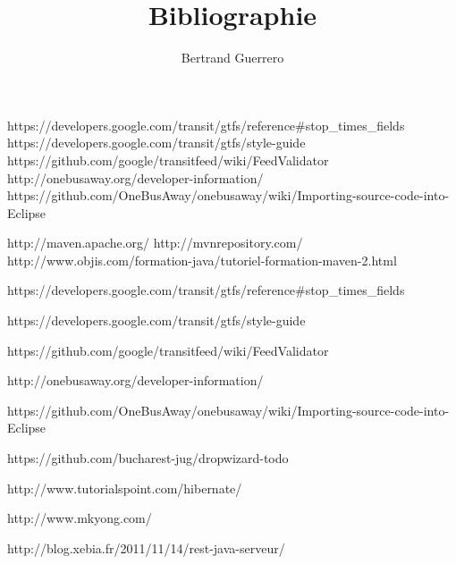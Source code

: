 \documentclass[a4paper,12pt]{report}
\title{Bibliographie}
\author{Bertrand Guerrero}
\date{}
\begin{document}
\cite{ref1}
\cite{ref2}
\cite{ref3}
\cite{ref4}
\cite{ref5}
\cite{ref6}
\cite{ref7}
\cite{ref8}
\cite{ref9}
\cite{ref10}
\cite{ref11}
\cite{ref12}
\cite{ref13}
\cite{ref14}
\cite{ref15}
\cite{ref16}
\cite{ref17}
\cite{ref18}
\cite{ref19}



https://developers.google.com/transit/gtfs/reference#stop_times_fields
https://developers.google.com/transit/gtfs/style-guide
https://github.com/google/transitfeed/wiki/FeedValidator
http://onebusaway.org/developer-information/
https://github.com/OneBusAway/onebusaway/wiki/Importing-source-code-into-Eclipse


http://maven.apache.org/
http://mvnrepository.com/
http://www.objis.com/formation-java/tutoriel-formation-maven-2.html


https://developers.google.com/transit/gtfs/reference#stop_times_fields

https://developers.google.com/transit/gtfs/style-guide

https://github.com/google/transitfeed/wiki/FeedValidator

http://onebusaway.org/developer-information/

https://github.com/OneBusAway/onebusaway/wiki/Importing-source-code-into-Eclipse

https://github.com/bucharest-jug/dropwizard-todo

http://www.tutorialspoint.com/hibernate/

http://www.mkyong.com/

http://blog.xebia.fr/2011/11/14/rest-java-serveur/ 
\end{document}
